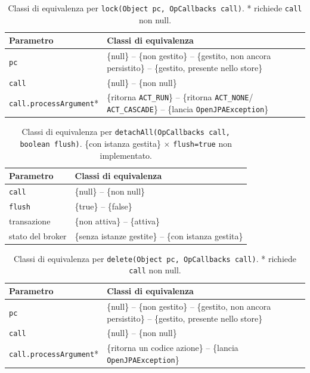\begin{table}[H]
\centering
\begin{tabularx}{\textwidth}{>{\raggedright\arraybackslash}p{} >{\raggedright\arraybackslash}X}
\toprule
Parametro & Classi di equivalenza \\
\midrule
\texttt{pc} & \{null\} -- \{non gestito\} -- \{gestito, non ancora persistito\} -- \{gestito,
presente nello store\} \\
\midrule
\texttt{call} & \{null\} -- \{non null\} \\
\texttt{call.processArgument}* & \{ritorna \texttt{ACT\_RUN}\} -- \{ritorna \texttt{ACT\_NONE}/
\texttt{ACT\_CASCADE}\} -- \{lancia \texttt{OpenJPAException}\} \\
\bottomrule
\end{tabularx}
\caption{Classi di equivalenza per \texttt{lock(Object pc, OpCallbacks call)}. * richiede
\texttt{call} non null.}
\label{tab:lock2-classi}
\end{table}

\begin{table}[H]
\centering
\begin{tabularx}{\textwidth}{>{\raggedright\arraybackslash}p{} >{\raggedright\arraybackslash}X}
\toprule
Parametro & Classi di equivalenza \\
\midrule
\texttt{call} & \{null\} -- \{non null\} \\
\texttt{flush} & \{true\} -- \{false\} \\
\midrule
transazione & \{non attiva\} -- \{attiva\} \\
\midrule
stato del broker & \{senza istanze gestite\} -- \{con istanza gestita\} \\
\bottomrule
\end{tabularx}
\caption{Classi di equivalenza per \texttt{detachAll(OpCallbacks call, boolean flush)}.
\{con istanza gestita\} $\times$ \texttt{flush=true} non implementato.}
\label{tab:detachall2-classi}
\end{table}

\begin{table}[H]
\centering
\begin{tabularx}{\textwidth}{>{\raggedright\arraybackslash}p{} >{\raggedright\arraybackslash}X}
\toprule
Parametro & Classi di equivalenza \\
\midrule
\texttt{pc} & \{null\} -- \{non gestito\} -- \{gestito, non ancora persistito\} -- \{gestito,
presente nello store\} \\
\midrule
\texttt{call} & \{null\} -- \{non null\} \\
\texttt{call.processArgument}* & \{ritorna un codice azione\} -- \{lancia \texttt{OpenJPAException}\} \\
\bottomrule
\end{tabularx}
\caption{Classi di equivalenza per \texttt{delete(Object pc, OpCallbacks call)}. * richiede
\texttt{call} non null.}
\label{tab:delete-classi}
\end{table}

